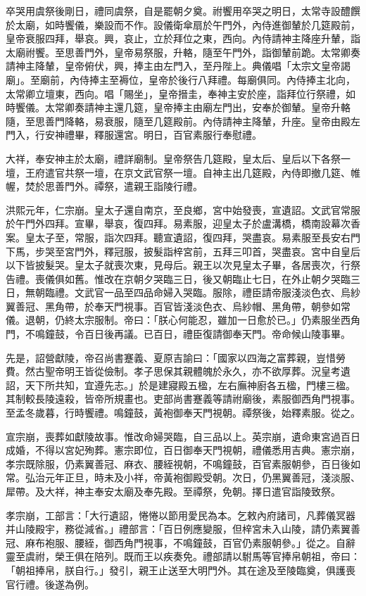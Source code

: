 卒哭用虞祭後剛日，禮同虞祭，自是罷朝夕奠。祔饗用卒哭之明日，太常寺設醴饌於太廟，如時饗儀，樂設而不作。設儀衛傘扇於午門外，內侍進御輦於几筵殿前，皇帝衰服四拜，舉哀。興，哀止，立於拜位之東，西向。內侍請神主降座升輦，詣太廟祔饗。至思善門外，皇帝易祭服，升輅，隨至午門外，詣御輦前跪。太常卿奏請神主降輦，皇帝俯伏，興，捧主由左門入，至丹陛上。典儀唱「太宗文皇帝謁廟」。至廟前，內侍捧主至褥位，皇帝於後行八拜禮。每廟俱同。內侍捧主北向，太常卿立壇東，西向。唱「賜坐」，皇帝搢圭，奉神主安於座，詣拜位行祭禮，如時饗儀。太常卿奏請神主還几筵，皇帝捧主由廟左門出，安奉於御輦。皇帝升輅隨，至思善門降輅，易衰服，隨至几筵殿前。內侍請神主降輦，升座。皇帝由殿左門入，行安神禮畢，釋服還宮。明日，百官素服行奉慰禮。

大祥，奉安神主於太廟，禮詳廟制。皇帝祭告几筵殿，皇太后、皇后以下各祭一壇，王府遣官共祭一壇，在京文武官祭一壇。自神主出几筵殿，內侍即撤几筵、帷幄，焚於思善門外。禫祭，遣親王詣陵行禮。

洪熙元年，仁宗崩。皇太子還自南京，至良鄉，宮中始發喪，宣遺詔。文武官常服於午門外四拜。宣畢，舉哀，復四拜。易素服，迎皇太子於盧溝橋，橋南設幕次香案。皇太子至，常服，詣次四拜。聽宣遺詔，復四拜，哭盡哀。易素服至長安右門下馬，步哭至宮門外，釋冠服，披髮詣梓宮前，五拜三叩首，哭盡哀。宮中自皇后以下皆披髮哭。皇太子就喪次東，見母后。親王以次見皇太子畢，各居喪次，行祭告禮。喪儀俱如舊。惟改在京朝夕哭臨三日，後又朝臨止七日，在外止朝夕哭臨三日，無朝臨禮。文武官一品至四品命婦入哭臨。服除，禮臣請帝服淺淡色衣、烏紗翼善冠、黑角帶，於奉天門視事。百官皆淺淡色衣、烏紗帽、黑角帶，朝參如常儀。退朝，仍終太宗服制。帝曰：「朕心何能忍，雖加一日愈於已。」仍素服坐西角門，不鳴鐘鼓，令百日後再議。已百日，禮臣復請御奉天門。帝命候山陵事畢。

先是，詔營獻陵，帝召尚書蹇義、夏原吉諭曰：「國家以四海之富葬親，豈惜勞費。然古聖帝明王皆從儉制。孝子思保其親體魄於永久，亦不欲厚葬。況皇考遺詔，天下所共知，宜遵先志。」於是建寢殿五楹，左右廡神廚各五楹，門樓三楹。其制較長陵遠殺，皆帝所規畫也。吏部尚書蹇義等請祔廟後，素服御西角門視事。至孟冬歲暮，行時饗禮。鳴鐘鼓，黃袍御奉天門視朝。禫祭後，始釋素服。從之。

宣宗崩，喪葬如獻陵故事。惟改命婦哭臨，自三品以上。英宗崩，遺命東宮過百日成婚，不得以宮妃殉葬。憲宗即位，百日御奉天門視朝，禮儀悉用吉典。憲宗崩，孝宗既除服，仍素翼善冠、麻衣、腰絰視朝，不鳴鐘鼓，百官素服朝參，百日後如常。弘治元年正旦，時未及小祥，帝黃袍御殿受朝。次日，仍黑翼善冠，淺淡服、犀帶。及大祥，神主奉安太廟及奉先殿。至禫祭，免朝。擇日遣官詣陵致祭。

孝宗崩，工部言：「大行遺詔，惓惓以節用愛民為本。乞敕內府諸司，凡葬儀冥器并山陵殿宇，務從減省。」禮部言：「百日例應變服，但梓宮未入山陵，請仍素翼善冠、麻布袍服、腰絰，御西角門視事，不鳴鐘鼓，百官仍素服朝參。」從之。自辭靈至虞祔，榮王俱在陪列。既而王以疾奏免。禮部請以駙馬等官捧帛朝祖，帝曰：「朝祖捧帛，朕自行。」發引，親王止送至大明門外。其在途及至陵臨奠，俱護喪官行禮。後遂為例。

